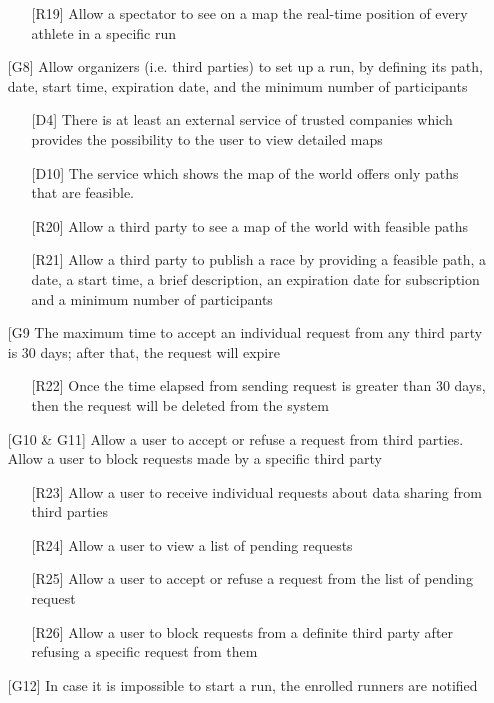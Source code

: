 \begin{itemize}
\begin{itemize}
	\item[{[R19]}] Allow a spectator to see on a map the real-time position of every athlete in a specific run
	\end{itemize}
\item[{[G8]}] Allow organizers (i.e. third parties) to set up a run, by defining its path, date, start time, expiration date, and the minimum number of participants
	\begin{itemize}
	\item[{[D4]}] There is at least an external service of trusted companies which provides the possibility to the user to view detailed maps
	\item[{[D10]}] The service which shows the map of the world offers only paths that are feasible.
	\item[{[R20]}] Allow a third party to see a map of the world with feasible paths
	\item[{[R21]}] Allow a third party to publish a race by providing a feasible path, a date, a start time, a brief description, an expiration date for subscription and a minimum number of participants
	\end{itemize}
\item[{[G9}] The maximum time to accept an individual request from any third party is 30 days; after that, the request will expire
	\begin{itemize}
	\item[{[R22]}] Once the time elapsed from sending request is greater than 30 days, then the request will be deleted from the system
	\end{itemize}
\item[{[G10 \& G11]}] Allow a user to accept or refuse a request from third parties. Allow a user to block requests made by a specific third party
	\begin{itemize}
	\item[{[R23]}] Allow a user to receive individual requests about data sharing from third parties
	\item[{[R24]}] Allow a user to view a list of pending requests
	\item[{[R25]}] Allow a user to accept or refuse a request from the list of pending request
	\item[{[R26]}] Allow a user to block requests from a definite third party after refusing a specific request from them
	\end{itemize}
\item[{[G12]}] In case it is impossible to start a run, the enrolled runners are notified

\end{itemize}
